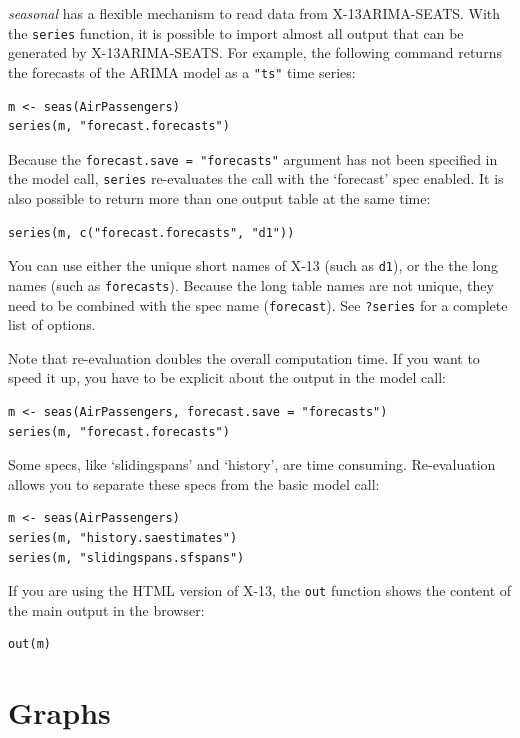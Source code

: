 \emph{seasonal} has a flexible mechanism to read data from
X-13ARIMA-SEATS. With the \texttt{series} function, it is possible to
import almost all output that can be generated by X-13ARIMA-SEATS. For
example, the following command returns the forecasts of the ARIMA model
as a \texttt{"ts"} time series:

\begin{verbatim}
m <- seas(AirPassengers)
series(m, "forecast.forecasts")
\end{verbatim}

Because the \texttt{forecast.save = "forecasts"} argument has not been
specified in the model call, \texttt{series} re-evaluates the call with
the `forecast' spec enabled. It is also possible to return more than one
output table at the same time:

\begin{verbatim}
series(m, c("forecast.forecasts", "d1"))
\end{verbatim}

You can use either the unique short names of X-13 (such as \texttt{d1}),
or the the long names (such as \texttt{forecasts}). Because the long
table names are not unique, they need to be combined with the spec name
(\texttt{forecast}). See \texttt{?series} for a complete list of
options.

Note that re-evaluation doubles the overall computation time. If you
want to speed it up, you have to be explicit about the output in the
model call:

\begin{verbatim}
m <- seas(AirPassengers, forecast.save = "forecasts")
series(m, "forecast.forecasts")
\end{verbatim}

Some specs, like `slidingspans' and `history', are time consuming.
Re-evaluation allows you to separate these specs from the basic model
call:

\begin{verbatim}
m <- seas(AirPassengers)
series(m, "history.saestimates")
series(m, "slidingspans.sfspans")
\end{verbatim}

If you are using the HTML version of X-13, the \texttt{out} function
shows the content of the main output in the browser:

\begin{verbatim}
out(m)
\end{verbatim}

\section{Graphs}\label{graphs}

